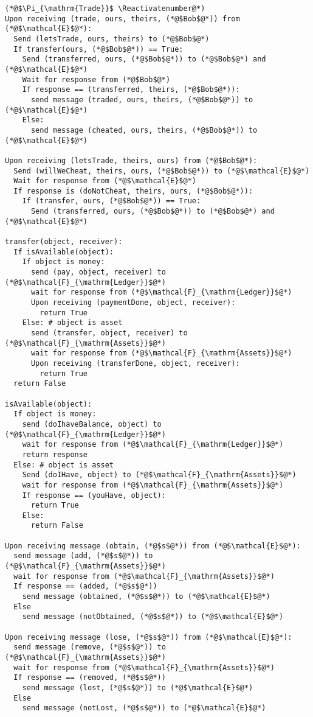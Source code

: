 \Suppressnumber
\begin{lstlisting}[label=tradeprot, style=numbers]
(*@$\Pi_{\mathrm{Trade}}$ \Reactivatenumber@*)
Upon receiving (trade, ours, theirs, (*@$Bob$@*)) from (*@$\mathcal{E}$@*):
  Send (letsTrade, ours, theirs) to (*@$Bob$@*)
  If transfer(ours, (*@$Bob$@*)) == True:
    Send (transferred, ours, (*@$Bob$@*)) to (*@$Bob$@*) and (*@$\mathcal{E}$@*)
    Wait for response from (*@$Bob$@*)
    If response == (transferred, theirs, (*@$Bob$@*)):
      send message (traded, ours, theirs, (*@$Bob$@*)) to (*@$\mathcal{E}$@*)
    Else:
      send message (cheated, ours, theirs, (*@$Bob$@*)) to (*@$\mathcal{E}$@*)

Upon receiving (letsTrade, theirs, ours) from (*@$Bob$@*):
  Send (willWeCheat, theirs, ours, (*@$Bob$@*)) to (*@$\mathcal{E}$@*)
  Wait for response from (*@$\mathcal{E}$@*)
  If response is (doNotCheat, theirs, ours, (*@$Bob$@*)):
    If (transfer, ours, (*@$Bob$@*)) == True:
      Send (transferred, ours, (*@$Bob$@*)) to (*@$Bob$@*) and (*@$\mathcal{E}$@*)

transfer(object, receiver):
  If isAvailable(object):
    If object is money:
      send (pay, object, receiver) to (*@$\mathcal{F}_{\mathrm{Ledger}}$@*)
      wait for response from (*@$\mathcal{F}_{\mathrm{Ledger}}$@*)
      Upon receiving (paymentDone, object, receiver):
        return True
    Else: # object is asset
      send (transfer, object, receiver) to (*@$\mathcal{F}_{\mathrm{Assets}}$@*)
      wait for response from (*@$\mathcal{F}_{\mathrm{Assets}}$@*)
      Upon receiving (transferDone, object, receiver):
        return True
  return False

isAvailable(object):
  If object is money:
    send (doIhaveBalance, object) to (*@$\mathcal{F}_{\mathrm{Ledger}}$@*)
    wait for response from (*@$\mathcal{F}_{\mathrm{Ledger}}$@*)
    return response
  Else: # object is asset
    Send (doIHave, object) to (*@$\mathcal{F}_{\mathrm{Assets}}$@*)
    wait for response from (*@$\mathcal{F}_{\mathrm{Assets}}$@*)
    If response == (youHave, object):
      return True
    Else:
      return False

Upon receiving message (obtain, (*@$s$@*)) from (*@$\mathcal{E}$@*):
  send message (add, (*@$s$@*)) to (*@$\mathcal{F}_{\mathrm{Assets}}$@*)
  wait for response from (*@$\mathcal{F}_{\mathrm{Assets}}$@*)
  If response == (added, (*@$s$@*))
    send message (obtained, (*@$s$@*)) to (*@$\mathcal{E}$@*)
  Else
    send message (notObtained, (*@$s$@*)) to (*@$\mathcal{E}$@*)

Upon receiving message (lose, (*@$s$@*)) from (*@$\mathcal{E}$@*):
  send message (remove, (*@$s$@*)) to (*@$\mathcal{F}_{\mathrm{Assets}}$@*)
  wait for response from (*@$\mathcal{F}_{\mathrm{Assets}}$@*)
  If response == (removed, (*@$s$@*))
    send message (lost, (*@$s$@*)) to (*@$\mathcal{E}$@*)
  Else
    send message (notLost, (*@$s$@*)) to (*@$\mathcal{E}$@*)
\end{lstlisting}
